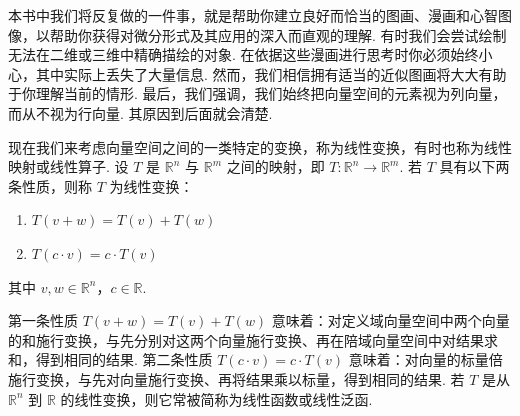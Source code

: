 本书中我们将反复做的一件事，就是帮助你建立良好而恰当的图画、漫画和心智图像，以帮助你获得对微分形式及其应用的深入而直观的理解. 有时我们会尝试绘制无法在二维或三维中精确描绘的对象. 在依据这些漫画进行思考时你必须始终小心，其中实际上丢失了大量信息. 然而，我们相信拥有适当的近似图画将大大有助于你理解当前的情形. 最后，我们强调，我们始终把向量空间的元素视为列向量，而从不视为行向量. 其原因到后面就会清楚.

现在我们来考虑向量空间之间的一类特定的变换，称为线性变换，有时也称为线性映射或线性算子. 设 $T$ 是 $\mathbb{R}^n$ 与 $\mathbb{R}^m$ 之间的映射，即 $T:\mathbb{R}^n\to\mathbb{R}^m$. 若 $T$ 具有以下两条性质，则称 $T$ 为线性变换：
\begin{enumerate}
  \item $T(v+w)=T(v)+T(w)$
  \item $T(c\cdot v)=c\cdot T(v)$
\end{enumerate}
其中 $v,w\in\mathbb{R}^n$，$c\in\mathbb{R}$.

第一条性质 $T(v+w)=T(v)+T(w)$ 意味着：对定义域向量空间中两个向量的和施行变换，与先分别对这两个向量施行变换、再在陪域向量空间中对结果求和，得到相同的结果. 第二条性质 $T(c\cdot v)=c\cdot T(v)$ 意味着：对向量的标量倍施行变换，与先对向量施行变换、再将结果乘以标量，得到相同的结果. 若 $T$ 是从 $\mathbb{R}^n$ 到 $\mathbb{R}$ 的线性变换，则它常被简称为线性函数或线性泛函.

